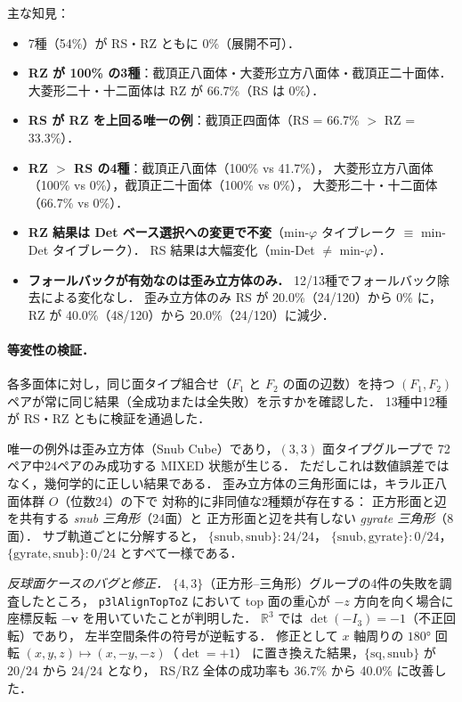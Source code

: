 \documentclass[12pt,a4paper]{article}
\theoremstyle{definition}
\begin{document}
\noindent
主な知見：
\begin{itemize}
  \item 7種（54\%）が RS・RZ ともに 0\%（展開不可）．
  \item \textbf{RZ が 100\% の3種}：截頂正八面体・大菱形立方八面体・截頂正二十面体．
        大菱形二十・十二面体は RZ が 66.7\%（RS は 0\%）．
  \item \textbf{RS が RZ を上回る唯一の例}：截頂正四面体（RS = 66.7\% $>$ RZ = 33.3\%）．
  \item \textbf{RZ $>$ RS の4種}：截頂正八面体（100\% vs 41.7\%），
        大菱形立方八面体（100\% vs 0\%），截頂正二十面体（100\% vs 0\%），
        大菱形二十・十二面体（66.7\% vs 0\%）．
  \item \textbf{RZ 結果は Det ベース選択への変更で不変}（min-$\varphi$ タイブレーク $\equiv$ min-Det タイブレーク）．
        RS 結果は大幅変化（min-Det $\ne$ min-$\varphi$）．
  \item \textbf{フォールバックが有効なのは歪み立方体のみ．}
        12/13種でフォールバック除去による変化なし．
        歪み立方体のみ RS が 20.0\%（24/120）から 0\% に，
        RZ が 40.0\%（48/120）から 20.0\%（24/120）に減少．
\end{itemize}

\paragraph{等変性の検証．}
各多面体に対し，同じ面タイプ組合せ（$F_1$ と $F_2$ の面の辺数）を持つ
$(F_1, F_2)$ ペアが常に同じ結果（全成功または全失敗）を示すかを確認した．
13種中12種が RS・RZ ともに検証を通過した．

唯一の例外は歪み立方体（Snub Cube）であり，$(3,3)$ 面タイプグループで
72ペア中24ペアのみ成功する MIXED 状態が生じる．
ただしこれは数値誤差ではなく，幾何学的に正しい結果である．
歪み立方体の三角形面には，キラル正八面体群 $O$（位数24）の下で
対称的に非同値な2種類が存在する：
正方形面と辺を共有する \emph{snub 三角形}（24面）と
正方形面と辺を共有しない \emph{gyrate 三角形}（8面）．
サブ軌道ごとに分解すると，
$\{\text{snub},\text{snub}\}: 24/24$，
$\{\text{snub},\text{gyrate}\}: 0/24$，
$\{\text{gyrate},\text{snub}\}: 0/24$ とすべて一様である．

\emph{反球面ケースのバグと修正．}
$\{4,3\}$（正方形--三角形）グループの4件の失敗を調査したところ，
\texttt{p3lAlignTopToZ} において top 面の重心が $-z$ 方向を向く場合に
座標反転 $-\mathbf{v}$ を用いていたことが判明した．
$\mathbb{R}^3$ では $\det(-I_3)=-1$（不正回転）であり，
左半空間条件の符号が逆転する．
修正として $x$ 軸周りの $180°$ 回転 $(x,y,z)\mapsto(x,-y,-z)$（$\det=+1$）
に置き換えた結果，$\{\mathrm{sq},\mathrm{snub}\}$ が $20/24$ から $24/24$ となり，
RS/RZ 全体の成功率も 36.7\% から 40.0\% に改善した．
\end{document}
